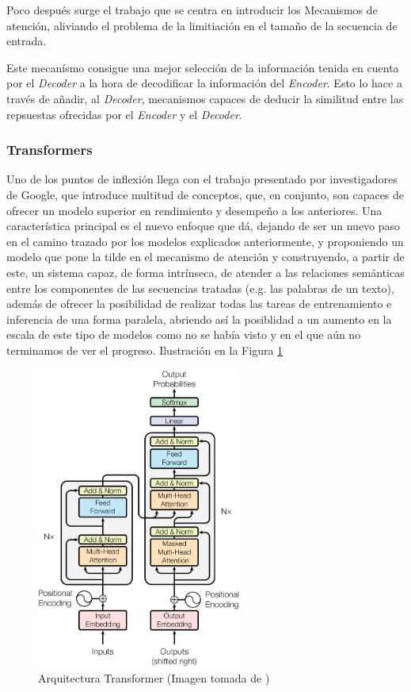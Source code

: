 Poco después surge el trabajo \cite{bahdanau2014neural} que se centra en introducir los Mecanismos de atención, aliviando el problema de la limitiación en el tamaño de la secuencia de entrada.

Este mecanísmo consigue una mejor selección de la información tenida en cuenta por el \textit{Decoder} a la hora de decodificar la información del \textit{Encoder}. Esto lo hace a través de añadir, al \textit{Decoder}, mecanismos capaces de deducir la similitud entre las repsuestas ofrecidas por el \textit{Encoder} y el \textit{Decoder}.
\newpage
\subsubsection{Transformers}

Uno de los puntos de inflexión llega con el trabajo \cite{vaswani2017attention} presentado por investigadores de Google, que introduce multitud de conceptos, que, en conjunto, son capaces de ofrecer un modelo superior en rendimiento y desempeño a los anteriores. Una característica principal es el nuevo enfoque que dá, dejando de ser un nuevo paso en el camino trazado por los modelos explicados anteriormente, y proponiendo un modelo que pone la tilde en el mecanismo de atención y construyendo, a partir de este, un sistema capaz, de forma intrínseca, de atender a las relaciones semánticas entre los componentes de las secuencias tratadas (e.g. las palabras de un texto), además de ofrecer la posibilidad de realizar todas las tareas de entrenamiento e inferencia de una forma paralela, abriendo así la posiblidad a un aumento en la escala de este tipo de modelos como no se había visto y en el que aún no terminamos de ver el progreso. Ilustración en la Figura \ref{fig:Transformer Architecture}

\begin{figure} [hb]
	\centering
	\includegraphics[width = 0.6\textwidth]{Imagenes/Vectorial/Transformer.pdf}
	\caption{Arquitectura Transformer (Imagen tomada de \cite{vaswani2017attention})}%
	\label{fig:Transformer Architecture}	
\end{figure}

